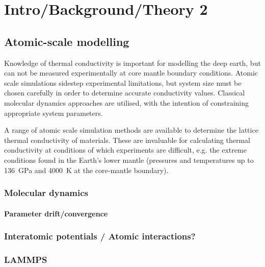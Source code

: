 \chapter{Intro/Background/Theory 2} 

\label{Chapter2} 



\section{Atomic-scale modelling}
Knowledge of thermal conductivity is important for modelling the deep earth, but can not be measured experimentally at core mantle boundary conditions. Atomic scale simulations sidestep experimental limitations, but system size must be chosen carefully in order to determine accurate conductivity values. Classical molecular dynamics approaches are utilised, with the intention of constraining appropriate system parameters.

A range of atomic scale simulation methods are available to determine the lattice thermal conductivity of materials. These are invaluable for calculating thermal conductivity at conditions of which experiments are difficult, e.g. the extreme conditions found in the Earth's lower mantle (pressures and temperatures up to 136~GPa and 4000~K at the core-mantle boundary). 

\subsection{Molecular dynamics}

\subsubsection{Parameter drift/convergence}

\subsection{Interatomic potentials / Atomic interactions?}

\subsection{LAMMPS}


